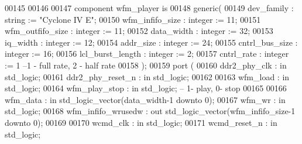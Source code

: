 \begin{DoxyCode}
00145 
00146 
00147 \textcolor{keywordflow}{component} wfm_player \textcolor{keywordflow}{is}
00148     \textcolor{keywordflow}{generic}(
00149             dev_family          : \textcolor{comment}{string}  := \textcolor{keyword}{"Cyclone IV E"}; 
00150             wfm_infifo_size : \textcolor{comment}{integer} := \textcolor{vhdllogic}{}\textcolor{vhdllogic}{11};
00151             wfm_outfifo_size    : \textcolor{comment}{integer} := \textcolor{vhdllogic}{}\textcolor{vhdllogic}{11};
00152             data_width          : \textcolor{comment}{integer} := \textcolor{vhdllogic}{}\textcolor{vhdllogic}{32};
00153             iq_width                : \textcolor{comment}{integer} := \textcolor{vhdllogic}{}\textcolor{vhdllogic}{12};
00154             addr_size           : \textcolor{comment}{integer} := \textcolor{vhdllogic}{}\textcolor{vhdllogic}{24};
00155             cntrl_bus_size      : \textcolor{comment}{integer} := \textcolor{vhdllogic}{}\textcolor{vhdllogic}{16};
00156             lcl_burst_length    : \textcolor{comment}{integer} := \textcolor{vhdllogic}{}\textcolor{vhdllogic}{2};
00157             cntrl_rate          : \textcolor{comment}{integer} := \textcolor{vhdllogic}{}\textcolor{vhdllogic}{1}\textcolor{keyword}{ --1 - full rate, 2 - half rate}
00158 );
00159   \textcolor{keywordflow}{port} (
00160         ddr2_phy_clk            : \textcolor{keywordflow}{in} \textcolor{comment}{std\_logic};
00161         ddr2_phy_reset_n        : \textcolor{keywordflow}{in} \textcolor{comment}{std\_logic};
00162 
00163         wfm_load                    : \textcolor{keywordflow}{in} \textcolor{comment}{std\_logic};
00164         wfm_play_stop           : \textcolor{keywordflow}{in} \textcolor{comment}{std\_logic}; \textcolor{keyword}{-- 1- play, 0- stop}
00165 
00166         wfm_data                    : \textcolor{keywordflow}{in} \textcolor{comment}{std\_logic\_vector}(data_width\textcolor{vhdlchar}{-}\textcolor{vhdllogic}{}\textcolor{vhdllogic}{1} \textcolor{keywordflow}{downto} \textcolor{vhdllogic}{}\textcolor{vhdllogic}{0});
00167         wfm_wr                  : \textcolor{keywordflow}{in} \textcolor{comment}{std\_logic};
00168         wfm_infifo_wrusedw  : \textcolor{keywordflow}{out} \textcolor{comment}{std\_logic\_vector}(wfm_infifo_size\textcolor{vhdlchar}{-}\textcolor{vhdllogic}{}\textcolor{vhdllogic}{1} \textcolor{keywordflow}{downto} \textcolor{vhdllogic}{}\textcolor{vhdllogic}{0});
00169 
00170         wcmd_clk                    : \textcolor{keywordflow}{in} \textcolor{comment}{std\_logic};
00171         wcmd_reset_n            : \textcolor{keywordflow}{in}  \textcolor{comment}{std\_logic};

\end{DoxyCode}
